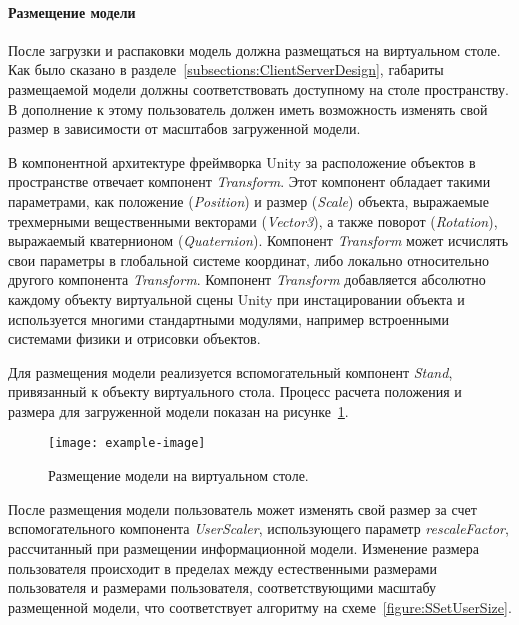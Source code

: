 ﻿\paragraph{Размещение модели}

После загрузки и распаковки модель должна размещаться на виртуальном столе.
Как было сказано в разделе~\ref{subsections:ClientServerDesign},
габариты размещаемой модели должны соответствовать доступному на столе пространству.
В дополнение к этому пользователь должен иметь возможность изменять
свой размер в зависимости от масштабов загруженной модели.

В компонентной архитектуре фреймворка Unity за расположение объектов
в пространстве отвечает компонент \emph{Transform}.
Этот компонент обладает такими параметрами, как
положение (\emph{Position}) и размер (\emph{Scale}) объекта,
выражаемые трехмерными вещественными векторами (\emph{Vector3}),
а также поворот (\emph{Rotation}), выражаемый кватернионом (\emph{Quaternion}).
Компонент \emph{Transform} может исчислять свои параметры
в глобальной системе координат, либо локально
относительно другого компонента \emph{Transform}.
Компонент \emph{Transform} добавляется абсолютно каждому объекту
виртуальной сцены Unity при инстацировании объекта
и используется многими стандартными модулями,
например встроенными системами физики и отрисовки объектов.%
\cite{DocUnity}

Для размещения модели реализуется вспомогательный компонент \emph{Stand},
привязанный к объекту виртуального стола. Процесс расчета положения
и размера для загруженной модели показан на рисунке~\ref{figure:SPlaceModel}.

\begin{figure}[!htp]
    \centering
    \texttt{[image: example-image]}
    \caption{Размещение модели на виртуальном столе.}
    \label{figure:SPlaceModel}
\end{figure}


После размещения модели пользователь может изменять свой размер
за счет вспомогательного компонента \emph{UserScaler},
использующего параметр \emph{rescaleFactor}, рассчитанный
при размещении информационной модели. Изменение размера пользователя
происходит в пределах между естественными размерами пользователя
и размерами пользователя, соответствующими масштабу размещенной модели,
что соответствует алгоритму на схеме~\ref{figure:SSetUserSize}.

